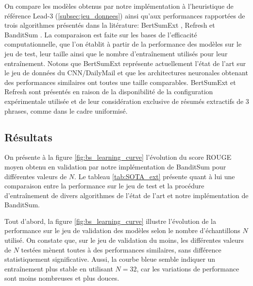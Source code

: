 On compare les modèles obtenus par notre implémentation à l'heuristique 
de référence Lead-3 (\ref{subsec:jeu_donnees}) ainsi qu'aux performances 
rapportées de trois algorithmes 
présentés dans la litérature: BertSumExt \citep{liu2019text},
Refresh \citep{narayan-etal-2018-ranking} et BanditSum \citep{dong2018banditsum}.
La comparaison est faite sur les bases de l'efficacité computationnelle,
que l'on établit à partir de la performance des modèles sur le jeu de test,
leur taille ainsi que le nombre d'entraînement utilisés pour leur entraînement.
Notons que BertSumExt représente actuellement l'état 
de l'art sur le jeu de données du CNN/DailyMail et que 
les architectures neuronales obtenant des performances similaires ont 
toutes une taille comparables.
BertSumExt et Refresh sont présentés 
en raison de la disponibilité de la configuration expérimentale 
utilisée et de leur considération exclusive de résumés 
extractifs de 3 phrases, comme dans le cadre uniformisé.

\subsection{Résultats}

On présente à la figure \ref{fig:bs_learning_curve} l'évolution 
du score ROUGE moyen obtenu en validation par notre implémentation 
de BanditSum pour différentes valeurs de $N$. 
Le tableau \ref{tab:SOTA_ext} présente quant à lui une comparaison 
entre la performance sur le jeu de test et la procédure 
d'entraînement de divers algorithmes de l'état de l'art et notre 
implémentation de BanditSum.

Tout d'abord, la figure \ref{fig:bs_learning_curve} illustre l'évolution 
de la performance sur le jeu de validation des modèles selon le 
nombre d'échantillons $N$ utilisé.
On constate que, sur le jeu de validation du moins, les différentes
valeurs de $N$ testées mènent toutes à des performances similaires,
sans différence statistiquement significative.
Aussi, la courbe bleue semble indiquer un entraînement plus stable 
en utilisant $N=32$, car les variations de performance sont moins 
nombreuses et plus douces.

